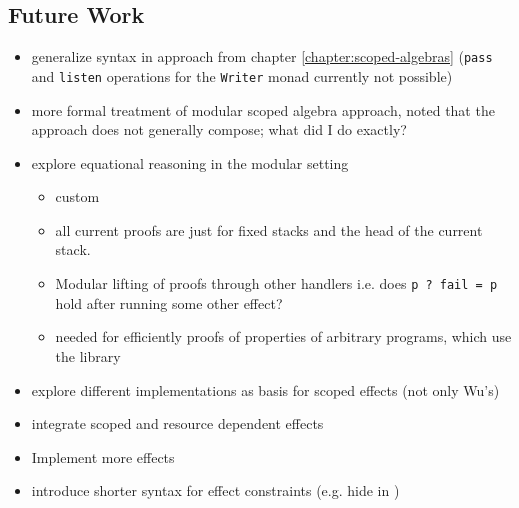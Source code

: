 \documentclass[10pt,a4paper,twoside]{report}
\begin{document}
\subsection{Future Work}
\begin{itemize}
  \item generalize syntax in approach from chapter \ref{chapter:scoped-algebras}
    (\texttt{pass} and \texttt{listen} operations for the \texttt{Writer} monad
    currently not possible)
  \item more formal treatment of modular scoped algebra approach,
    \textcite{DBLP:conf/lics/PirogSWJ18} noted that the approach does not
    generally compose; what did I do exactly?
  \item explore equational reasoning in the modular setting
  \begin{itemize}
    \item custom 
    \item all current proofs are just for fixed stacks and the head of the
      current stack.
    \item Modular lifting of proofs through other handlers i.e. does \texttt{p ?
        fail = p} hold after running some other effect?
    \item needed for efficiently proofs of properties of arbitrary programs,
      which use the library
  \end{itemize}
  \item explore different implementations as basis for scoped effects (not only Wu's)
  \item integrate scoped and resource dependent effects
  \item Implement more effects
  \item introduce shorter syntax for effect constraints (e.g. hide
     in )
\end{itemize}

\printbibliography
\end{document}
